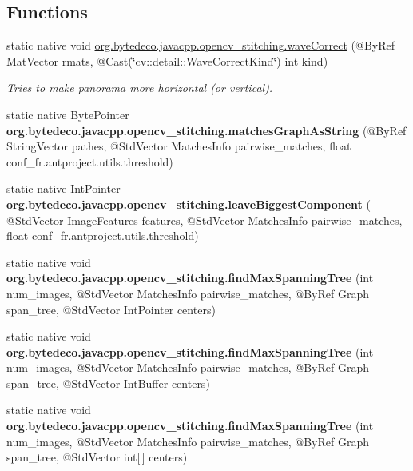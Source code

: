 \subsection*{Functions}
\begin{DoxyCompactItemize}
\item 
static native void \hyperlink{group__stitching__rotation_ga3bba1a4cfe47a38f2ef140a3bc6c0f0a}{org.\+bytedeco.\+javacpp.\+opencv\+\_\+stitching.\+wave\+Correct} (@By\+Ref Mat\+Vector rmats, @Cast(\char`\"{}cv\+::detail\+::\+Wave\+Correct\+Kind\char`\"{}) int kind)
\begin{DoxyCompactList}\small\item\em Tries to make panorama more horizontal (or vertical). \end{DoxyCompactList}\item 
\mbox{\label{group__stitching__rotation_gaf59145e19f75e6b8edfd6d5ff201b105}} 
static native Byte\+Pointer {\bfseries org.\+bytedeco.\+javacpp.\+opencv\+\_\+stitching.\+matches\+Graph\+As\+String} (@By\+Ref String\+Vector pathes, @Std\+Vector Matches\+Info pairwise\+\_\+matches, float conf\+\_\+fr.antproject.utils.threshold)
\item 
\mbox{\label{group__stitching__rotation_ga760b0ed1e8fbdca1c7460a416ba66f67}} 
static native Int\+Pointer {\bfseries org.\+bytedeco.\+javacpp.\+opencv\+\_\+stitching.\+leave\+Biggest\+Component} ( @Std\+Vector Image\+Features features, @Std\+Vector Matches\+Info pairwise\+\_\+matches, float conf\+\_\+fr.antproject.utils.threshold)
\item 
\mbox{\label{group__stitching__rotation_ga75940ac245f57bd5ddba8a98e3add77f}} 
static native void {\bfseries org.\+bytedeco.\+javacpp.\+opencv\+\_\+stitching.\+find\+Max\+Spanning\+Tree} (int num\+\_\+images, @Std\+Vector Matches\+Info pairwise\+\_\+matches, @By\+Ref Graph span\+\_\+tree, @Std\+Vector Int\+Pointer centers)
\item 
\mbox{\label{group__stitching__rotation_gaee2fa9577ddb5597f52168b779e47999}} 
static native void {\bfseries org.\+bytedeco.\+javacpp.\+opencv\+\_\+stitching.\+find\+Max\+Spanning\+Tree} (int num\+\_\+images, @Std\+Vector Matches\+Info pairwise\+\_\+matches, @By\+Ref Graph span\+\_\+tree, @Std\+Vector Int\+Buffer centers)
\item 
\mbox{\label{group__stitching__rotation_gacc151640cf63f2210ed175b4df01a79c}} 
static native void {\bfseries org.\+bytedeco.\+javacpp.\+opencv\+\_\+stitching.\+find\+Max\+Spanning\+Tree} (int num\+\_\+images, @Std\+Vector Matches\+Info pairwise\+\_\+matches, @By\+Ref Graph span\+\_\+tree, @Std\+Vector int\mbox{[}$\,$\mbox{]} centers)
\end{DoxyCompactItemize}
